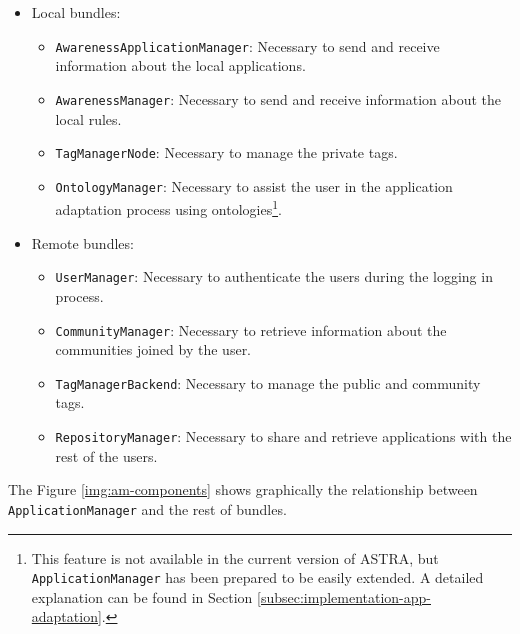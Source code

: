 \begin{itemize}
  \item Local bundles:
	\begin{itemize}
	  \item \verb|AwarenessApplicationManager|: Necessary to send and receive
	  information about the local applications.
	  \item \verb|AwarenessManager|: Necessary to send and receive information
	  about the local rules.
	  \item \verb|TagManagerNode|: Necessary to manage the private tags.
	  \item \verb|OntologyManager|: Necessary to assist the user in the application
	  adaptation process using ontologies\footnote{This feature is not available
	  in the current version of ASTRA, but \texttt{ApplicationManager} has been
	  prepared to be easily extended. A detailed explanation can be found in Section
	  \ref{subsec:implementation-app-adaptation}.}.
    \end{itemize}
   
   \item Remote bundles:
	\begin{itemize}
	  \item \verb|UserManager|: Necessary to authenticate the users during the
	  logging in process.
	  \item \verb|CommunityManager|: Necessary to retrieve information about the
	  communities joined by the user.
	  \item \verb|TagManagerBackend|: Necessary to manage the public and community
	  tags.
	  \item \verb|RepositoryManager|: Necessary to share and retrieve applications
	  with the rest of the users.
    \end{itemize}
    
\end{itemize}

The Figure \ref{img:am-components} shows graphically the relationship between
\verb|ApplicationManager| and the rest of bundles.


